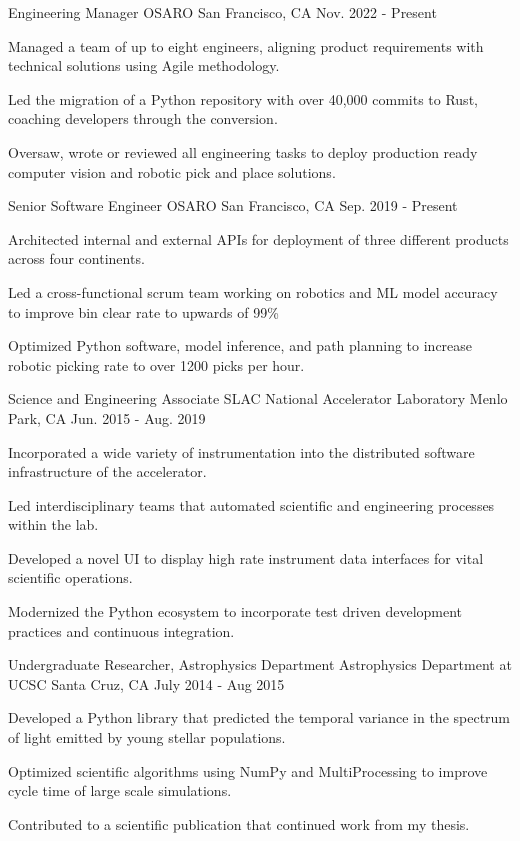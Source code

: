 \begin{cventries}
  \cventry
    {Engineering Manager}
    {OSARO}
    {San Francisco, CA}
    {Nov. 2022 - Present}
    {
      \begin{cvitems}
        \item {Managed a team of up to eight engineers, aligning product requirements with technical solutions using Agile methodology.}
        \item {Led the migration of a Python repository with over 40,000 commits to Rust, coaching developers through the conversion.}
        \item {Oversaw, wrote or reviewed all engineering tasks to deploy production ready computer vision and robotic pick and place solutions.}
      \end{cvitems}
    }
  \cventry
    {Senior Software Engineer}
    {OSARO}
    {San Francisco, CA}
    {Sep. 2019 - Present}
    {
      \begin{cvitems}
        \item {Architected internal and external APIs for deployment of three different products across four continents.}
        \item {Led a cross-functional scrum team working on robotics and ML model accuracy to improve bin clear rate to upwards of 99\% }
        \item {Optimized Python software, model inference, and path planning to increase robotic picking rate to over 1200 picks per hour.}
      \end{cvitems}
    }
  \cventry
    {Science and Engineering Associate}
    {SLAC National Accelerator Laboratory}
    {Menlo Park, CA}
    {Jun. 2015 - Aug. 2019}
    {
      \begin{cvitems}
	     \item {Incorporated a wide variety of instrumentation into the distributed software infrastructure of the accelerator.}
         \item {Led interdisciplinary teams that automated scientific and engineering processes within the lab.}
         \item {Developed a novel UI to display high rate instrument data interfaces for vital scientific operations.}
	     \item {Modernized the Python ecosystem to incorporate test driven development practices and continuous integration.}
      \end{cvitems}
    }
  \cventry
    {Undergraduate Researcher, Astrophysics Department}
    {Astrophysics Department at UCSC}
    {Santa Cruz, CA}
    {July 2014 - Aug 2015}
    {
      \begin{cvitems}
        \item {Developed a Python library that predicted the temporal variance in the spectrum of light emitted by young stellar populations.}
        \item {Optimized scientific algorithms using NumPy and MultiProcessing to improve cycle time of large scale simulations.}
        \item {Contributed to a scientific publication that continued work from my thesis.}
      \end{cvitems}
      }
\end{cventries}
